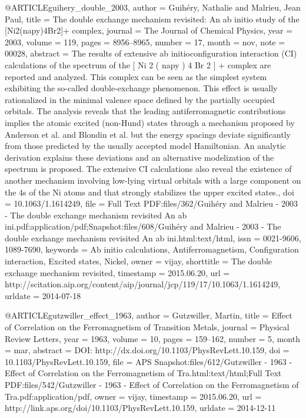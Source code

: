 @ARTICLE{guihery_double_2003,
  author = {Guihéry, Nathalie and Malrieu, Jean Paul},
  title = {The double exchange mechanism revisited: {An} ab initio study of
	the [{Ni}2(napy)4Br2]+ complex},
  journal = {The Journal of Chemical Physics},
  year = {2003},
  volume = {119},
  pages = {8956--8965},
  number = {17},
  month = nov,
  note = {00028},
  abstract = {The results of extensive ab initioconfiguration interaction (CI) calculations
	of the spectrum of the [ Ni 2 ( napy ) 4 Br 2 ] + complex are reported
	and analyzed. This complex can be seen as the simplest system exhibiting
	the so-called double-exchange phenomenon. This effect is usually
	rationalized in the minimal valence space defined by the partially
	occupied orbitals. The analysis reveals that the leading antiferromagnetic
	contributions implies the atomic excited (non-Hund) states through
	a mechanism proposed by Anderson et al. and Blondin et al. but the
	energy spacings deviate significantly from those predicted by the
	usually accepted model Hamiltonian. An analytic derivation explains
	these deviations and an alternative modelization of the spectrum
	is proposed. The extensive CI calculations also reveal the existence
	of another mechanism involving low-lying virtual orbitals with a
	large component on the 4s of the Ni atoms and that strongly stabilizes
	the upper excited states.},
  doi = {10.1063/1.1614249},
  file = {Full Text PDF:files/362/Guihéry and Malrieu - 2003 - The double exchange mechanism revisited An ab ini.pdf:application/pdf;Snapshot:files/608/Guihéry and Malrieu - 2003 - The double exchange mechanism revisited An ab ini.html:text/html},
  issn = {0021-9606, 1089-7690},
  keywords = {Ab initio calculations, Antiferromagnetism, Configuration interaction,
	Excited states, Nickel},
  owner = {vijay},
  shorttitle = {The double exchange mechanism revisited},
  timestamp = {2015.06.20},
  url = {http://scitation.aip.org/content/aip/journal/jcp/119/17/10.1063/1.1614249},
  urldate = {2014-07-18}
}

@ARTICLE{gutzwiller_effect_1963,
  author = {Gutzwiller, Martin},
  title = {Effect of {Correlation} on the {Ferromagnetism} of {Transition} {Metals}},
  journal = {Physical Review Letters},
  year = {1963},
  volume = {10},
  pages = {159--162},
  number = {5},
  month = mar,
  abstract = {DOI: http://dx.doi.org/10.1103/PhysRevLett.10.159},
  doi = {10.1103/PhysRevLett.10.159},
  file = {APS Snapshot:files/612/Gutzwiller - 1963 - Effect of Correlation on the Ferromagnetism of Tra.html:text/html;Full Text PDF:files/542/Gutzwiller - 1963 - Effect of Correlation on the Ferromagnetism of Tra.pdf:application/pdf},
  owner = {vijay},
  timestamp = {2015.06.20},
  url = {http://link.aps.org/doi/10.1103/PhysRevLett.10.159},
  urldate = {2014-12-11}
}

